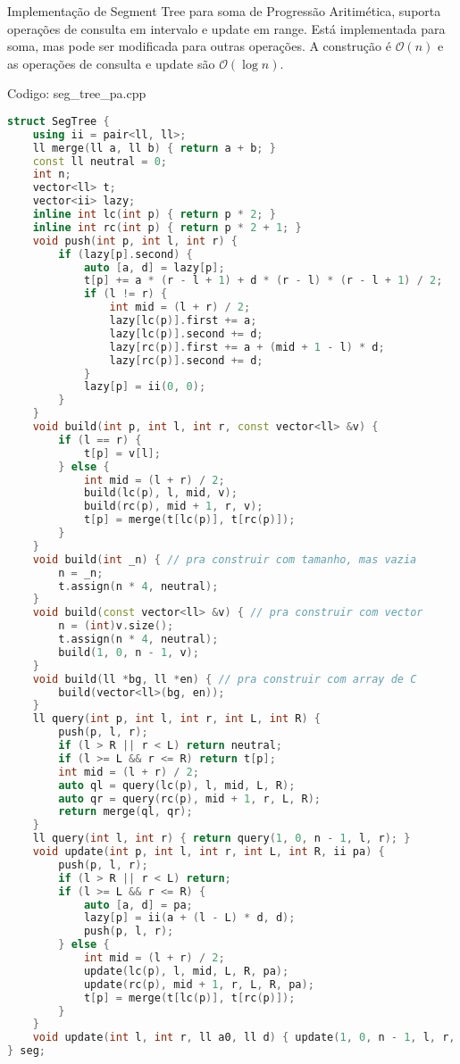 \documentclass[10pt, a4paper, oneside]{book}
\begin{document}
Implementação de Segment Tree para soma de Progressão Aritimética, suporta operações de consulta em intervalo e update em range. Está implementada para soma, mas pode ser modificada para outras operações. A construção é $\mathcal{O}(n)$ e as operações de consulta e update são $\mathcal{O}(\log n)$.

\hfill

Codigo: seg\_tree\_pa.cpp

\begin{lstlisting}[language=C++]
struct SegTree {
    using ii = pair<ll, ll>;
    ll merge(ll a, ll b) { return a + b; }
    const ll neutral = 0;
    int n;
    vector<ll> t;
    vector<ii> lazy;
    inline int lc(int p) { return p * 2; }
    inline int rc(int p) { return p * 2 + 1; }
    void push(int p, int l, int r) {
        if (lazy[p].second) {
            auto [a, d] = lazy[p];
            t[p] += a * (r - l + 1) + d * (r - l) * (r - l + 1) / 2;
            if (l != r) {
                int mid = (l + r) / 2;
                lazy[lc(p)].first += a;
                lazy[lc(p)].second += d;
                lazy[rc(p)].first += a + (mid + 1 - l) * d;
                lazy[rc(p)].second += d;
            }
            lazy[p] = ii(0, 0);
        }
    }
    void build(int p, int l, int r, const vector<ll> &v) {
        if (l == r) {
            t[p] = v[l];
        } else {
            int mid = (l + r) / 2;
            build(lc(p), l, mid, v);
            build(rc(p), mid + 1, r, v);
            t[p] = merge(t[lc(p)], t[rc(p)]);
        }
    }
    void build(int _n) { // pra construir com tamanho, mas vazia
        n = _n;
        t.assign(n * 4, neutral);
    }
    void build(const vector<ll> &v) { // pra construir com vector
        n = (int)v.size();
        t.assign(n * 4, neutral);
        build(1, 0, n - 1, v);
    }
    void build(ll *bg, ll *en) { // pra construir com array de C
        build(vector<ll>(bg, en));
    }
    ll query(int p, int l, int r, int L, int R) {
        push(p, l, r);
        if (l > R || r < L) return neutral;
        if (l >= L && r <= R) return t[p];
        int mid = (l + r) / 2;
        auto ql = query(lc(p), l, mid, L, R);
        auto qr = query(rc(p), mid + 1, r, L, R);
        return merge(ql, qr);
    }
    ll query(int l, int r) { return query(1, 0, n - 1, l, r); }
    void update(int p, int l, int r, int L, int R, ii pa) {
        push(p, l, r);
        if (l > R || r < L) return;
        if (l >= L && r <= R) {
            auto [a, d] = pa;
            lazy[p] = ii(a + (l - L) * d, d);
            push(p, l, r);
        } else {
            int mid = (l + r) / 2;
            update(lc(p), l, mid, L, R, pa);
            update(rc(p), mid + 1, r, L, R, pa);
            t[p] = merge(t[lc(p)], t[rc(p)]);
        }
    }
    void update(int l, int r, ll a0, ll d) { update(1, 0, n - 1, l, r, ii(a0, d)); }
} seg;
\end{lstlisting}
\hfill
\end{document}
